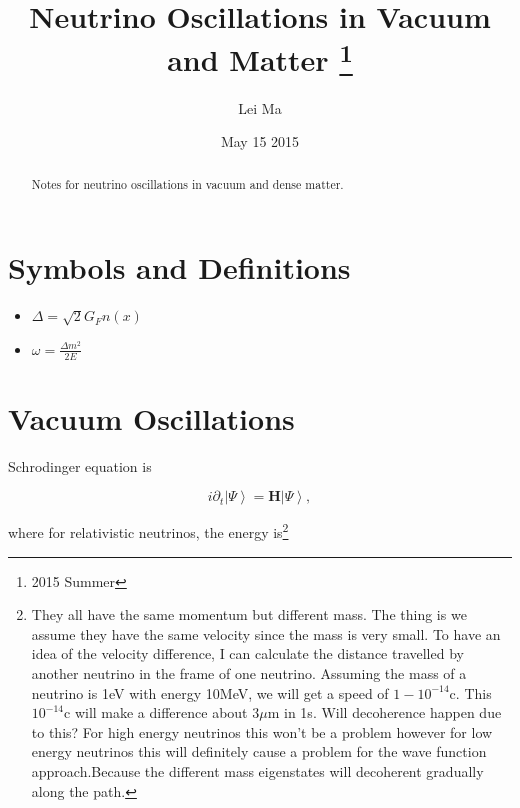 \documentclass{tufte-handout}
\title{Neutrino Oscillations in Vacuum and Matter \thanks{2015 Summer}}
\author[Lei Ma]{Lei Ma}
\date{May 15 2015}  %
\newcommand{\ket}[1]{\left| #1\right\rangle}
\begin{document}
\maketitle%

\begin{abstract}
\noindent Notes for neutrino oscillations in vacuum and dense matter.
\end{abstract}

\tableofcontents



\section{Symbols and Definitions}

\begin{itemize}
\item 
$\Delta = \sqrt{2} G_F n(x) $
\item
$\omega = \frac{\Delta m^2}{2E}$
\end{itemize}




\section{Vacuum Oscillations}

Schrodinger equation is

\begin{equation}
i\partial_t \ket{\Psi} = \mathbf H \ket{\Psi},
\end{equation}

where for relativistic neutrinos, the energy is\footnote{They all have the same momentum but different mass. The thing is we assume they have the same velocity since the mass is very small. To have an idea of the velocity difference, I can calculate the distance travelled by another neutrino in the frame of one neutrino.\newline
Assuming the mass of a neutrino is 1eV with energy 10MeV, we will get a speed of $1-10^{-14}$c. This $10^{-14}$c will make a difference about $3\mu\mathrm{ m}$ in 1s.
 \newline Will decoherence happen due to this? For high energy neutrinos this won't be a problem however for low energy neutrinos this will definitely cause a problem for the wave function approach.Because the different mass eigenstates will decoherent gradually along the path.}
\end{document}
